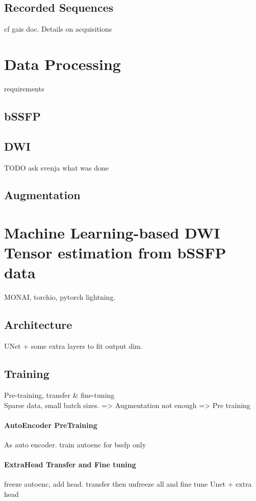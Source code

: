 \subsection{Recorded Sequences}
cf gais doc.
Details on acquisitions

\section{Data Processing}
requirements
\subsection{bSSFP}

\subsection{DWI}
TODO ask svenja what was done

\subsection{Augmentation}


\section{Machine Learning-based DWI Tensor estimation from bSSFP data}
MONAI, torchio, pytorch lightning. 

\subsection{Architecture}
UNet + some extra layers to fit output dim.

\subsection{Training}
Pre-training, transfer \& fine-tuning \\

Sparse data, small batch sizes. => Augmentation not enough => Pre training
\paragraph{AutoEncoder PreTraining}
As auto encoder. train autoenc for bssfp only 

\paragraph{ExtraHead Transfer and Fine tuning}
freeze autoenc, add head. transfer then unfreeze all and fine tune
Unet + extra head
